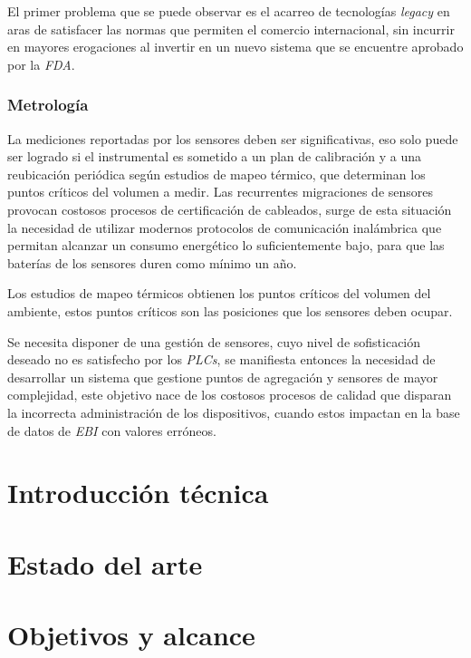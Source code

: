 			El primer problema que se puede observar es el acarreo de tecnologías \emph{legacy} en aras de satisfacer las normas que permiten el comercio internacional, sin incurrir en mayores erogaciones al invertir en un nuevo sistema que se encuentre aprobado por la \emph{FDA}.

		\subsubsection{Metrología}
		
			La mediciones reportadas por los sensores deben ser significativas, eso solo puede ser logrado si el instrumental es sometido a un plan de calibración y a una reubicación periódica según estudios de mapeo térmico, que determinan los puntos críticos del volumen a medir.
			Las recurrentes migraciones de sensores provocan costosos procesos de certificación de cableados, surge de esta situación la necesidad de utilizar modernos protocolos de comunicación inalámbrica que permitan alcanzar un consumo energético lo suficientemente bajo, para que las baterías de los sensores duren como mínimo un año.
			
			Los estudios de mapeo térmicos obtienen los puntos críticos del volumen del ambiente, estos puntos críticos son las posiciones que los sensores deben ocupar.
			
			Se necesita disponer de una gestión de sensores, cuyo nivel de sofisticación deseado no es satisfecho por los \emph{PLCs}, se manifiesta entonces la necesidad de desarrollar un sistema que gestione puntos de agregación y sensores de mayor complejidad, este objetivo nace de los costosos procesos de calidad que disparan la incorrecta administración de los dispositivos, cuando estos impactan en la base de datos de \emph{EBI} con valores erróneos.		

\section{Introducción técnica}
\label{introTecnica}

\section{Estado del arte}
\label{estadoArte}

\section{Objetivos y alcance}
\label{objetivos}
